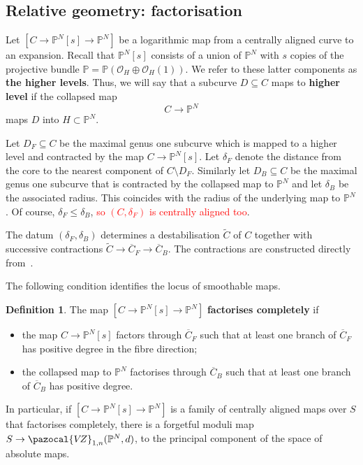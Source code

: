 \documentclass[11pt]{amsart}
\newcommand{\tred}{\textcolor{red}}
\newcommand{\VZ}{\pazocal{V\!Z}}
\renewcommand{\to}{\rightarrow}
\theoremstyle{definition}
\theoremstyle{definition}
\newtheorem{definition}[thm]{Definition}
\begin{document}
\subsection{Relative geometry: factorisation}\label{subsection factorisation} Let $[C\to \mathbb P^N[s]\to \mathbb P^N]$ be a logarithmic map from a centrally aligned curve to an expansion. Recall that $\mathbb P^N[s]$ consists of a union of $\mathbb P^N$ with $s$ copies of the projective bundle $\mathbb{P} = \mathbb P(\mathcal O_H\oplus \mathcal O_H(1))$. We refer to these latter components as \textbf{the higher levels}. Thus, we will say that a subcurve $D\subseteq C$ maps to \textbf{higher level} if the collapsed map
\[
C\to \mathbb P^N
\]
maps $D$ into $H\subset \mathbb P^N$. 

Let $D_F\subseteq C$ be the maximal genus one subcurve which is mapped to a higher level and contracted by the map $C\to \mathbb P^N[s]$. Let $\delta_F$ denote the distance from the core to the nearest component of $C \setminus D_F$. Similarly let $D_B\subseteq C$ be the maximal genus one subcurve that is contracted by the collapsed map to $\mathbb P^N$ and let $\delta_B$ be the associated radius. This coincides with the radius of the underlying map to $\mathbb P^N$. Of course, $\delta_F\leq \delta_B$, \tred{so $(C,\delta_F)$ is centrally aligned too}.

The datum $(\delta_F,\delta_B)$ determines a destabilisation $\widetilde C$ of $C$ together with successive contractions $\widetilde C\to \overline C_F\to\overline C_B$. The contractions are constructed directly from~\cite[Section~3]{RSPW}.

The following condition identifies the locus of smoothable maps. 

\begin{definition}
The map $[C\to \mathbb P^N[s]\to \mathbb P^N]$ \textbf{factorises completely} if
\begin{itemize}
\item the map $C\to \mathbb P^N[s]$ factors through $\overline C_F$ such that at least one branch of $\overline C_F$ has positive degree in the fibre direction; 
\item the collapsed map to $\mathbb P^N$ factorises through $\overline C_B$ such that at least one branch of $\overline C_B$ has positive degree.
\end{itemize}
\end{definition}

In particular, if $[C\to \mathbb P^N[s]\to \mathbb P^N]$ is a family of centrally aligned maps over $S$ that factorises completely, there is a forgetful moduli map $S\to \VZ_{1,n}(\mathbb P^N,d)$, to the principal component of the space of absolute maps.
\end{document}

